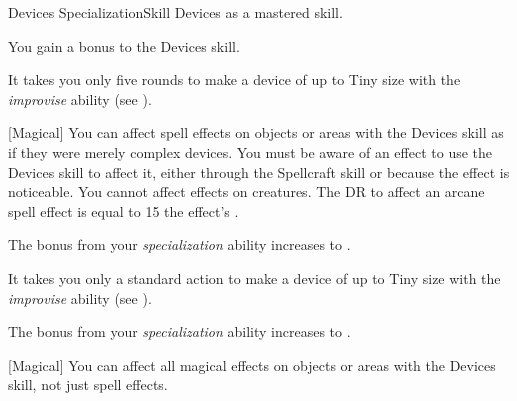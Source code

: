     \begin{feat}{Devices Specialization}{Skill}
        \featpre Devices as a mastered skill.

         You gain a  bonus to the Devices skill.

         It takes you only five rounds to make a device of up to Tiny size with the \textit{improvise} ability (see ).

        [Magical] You can affect spell effects on objects or areas with the Devices skill as if they were merely complex devices.
        You must be aware of an effect to use the Devices skill to affect it, either through the Spellcraft skill or because the effect is noticeable.
        You cannot affect effects on creatures.
        The DR to affect an arcane spell effect is equal to 15 \add the effect's .

         The bonus from your \textit{specialization} ability increases to .

         It takes you only a standard action to make a device of up to Tiny size with the \textit{improvise} ability (see ).

         The bonus from your \textit{specialization} ability increases to .

        [Magical] You can affect all magical effects on objects or areas with the Devices skill, not just spell effects.
    \end{feat}

